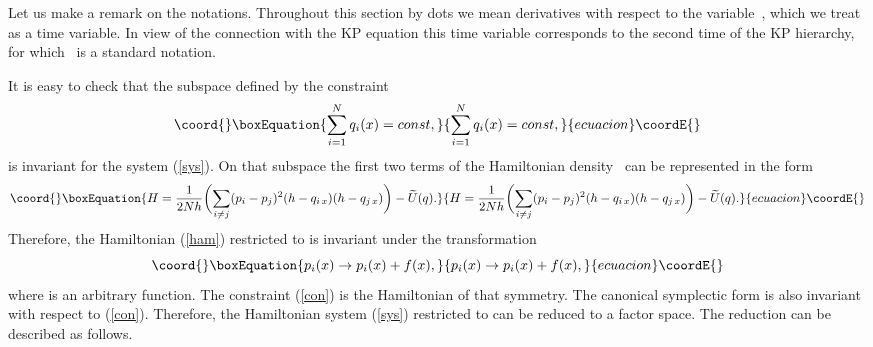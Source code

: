\documentclass[a4paper,11pt]{article}
\providecommand{\wt}{\widetilde}
\theoremstyle{plain}
\theoremstyle{remark}
\begin{document}
Let us make a remark on the notations. Throughout this section by dots
we mean derivatives with respect to the variable~\coordHE{}, which we treat as
a time variable.
In view of the connection with the KP equation this time variable
corresponds to the second time of the KP hierarchy, for which~\coordHE{} is
a standard notation.

It is easy to check that the subspace \coordHE{} defined by the constraint
\begin{equation}\coord{}\boxEquation{\label{con}
\sum_{i=1}^N q_i(x)=const ,
}{\sum_{i=1}^N q_i(x)=const ,
}{ecuacion}\coordE{}\end{equation}
is invariant for the system (\ref{sys}).
On that subspace the first two terms of the Hamiltonian density~\coordHE{} can be
represented in the form
\begin{equation}\coord{}\boxEquation{
H=\frac{1}{2Nh}\biggl(\sum_{i\ne j} (p_i-p_j)^2 (h-q_{i\,x})(h-q_{j\,x})
\biggr) -\wt U(q) .
}{
H=\frac{1}{2Nh}\biggl(\sum_{i\ne j} (p_i-p_j)^2 (h-q_{i\,x})(h-q_{j\,x})
\biggr) -\wt U(q) .
}{ecuacion}\coordE{}\end{equation}
Therefore, the Hamiltonian (\ref{ham}) restricted to \coordHE{} is invariant
under the transformation
\begin{equation}\coord{}\boxEquation{\label{psym}
p_i(x)\to p_i(x)+f(x),
}{p_i(x)\to p_i(x)+f(x),
}{ecuacion}\coordE{}\end{equation}
where \coordHE{} is an arbitrary function.
The constraint (\ref{con}) is the Hamiltonian of that symmetry. The canonical
symplectic form is also invariant with respect to (\ref{con}). Therefore, the
Hamiltonian system (\ref{sys}) restricted to \coordHE{} can be reduced to a
factor space. The reduction can be described as follows.
\end{document}
